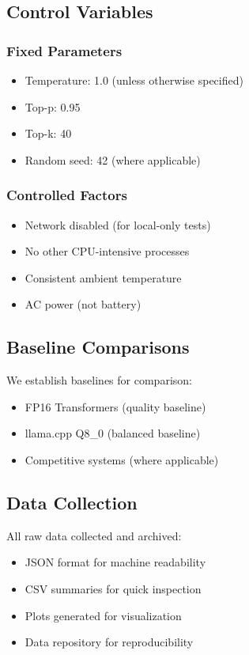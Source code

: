 \subsection{Control Variables}

\subsubsection{Fixed Parameters}

\begin{itemize}
    \item Temperature: 1.0 (unless otherwise specified)
    \item Top-p: 0.95
    \item Top-k: 40
    \item Random seed: 42 (where applicable)
\end{itemize}

\subsubsection{Controlled Factors}

\begin{itemize}
    \item Network disabled (for local-only tests)
    \item No other CPU-intensive processes
    \item Consistent ambient temperature
    \item AC power (not battery)
\end{itemize}

\subsection{Baseline Comparisons}

We establish baselines for comparison:

\begin{itemize}
    \item FP16 Transformers (quality baseline)
    \item llama.cpp Q8\_0 (balanced baseline)
    \item Competitive systems (where applicable)
\end{itemize}

\subsection{Data Collection}

All raw data collected and archived:

\begin{itemize}
    \item JSON format for machine readability
    \item CSV summaries for quick inspection
    \item Plots generated for visualization
    \item Data repository for reproducibility
\end{itemize}
